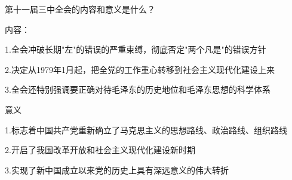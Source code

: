 \documentclass[lang=cn,10pt]{elegantbook}
\begin{document}
	\begin{example}
		第十一届三中全会的内容和意义是什么？
	\end{example}
	\begin{solution}
		
		内容：
		
		1.全会冲破长期"左"的错误的严重束缚，彻底否定"两个凡是"的错误方针
		
		2.决定从1979年1月起，把全党的工作重心转移到社会主义现代化建设上来
		
		3.全会还特别强调要正确对待毛泽东的历史地位和毛泽东思想的科学体系
		
		意义
		
		1.标志着中国共产党重新确立了马克思主义的思想路线、政治路线、组织路线
		
		2.开启了我国改革开放和社会主义现代化建设新时期
		
		3.实现了新中国成立以来党的历史上具有深远意义的伟大转折
		
	\end{solution}
	\begin{example}
		
	\end{example}
	
\end{document}
